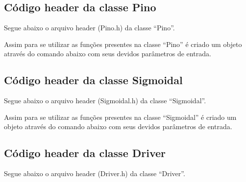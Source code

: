 \subsection{Código header da classe Pino}\label{subsec:respino}

Segue abaixo o arquivo header (Pino.h) da classe “Pino”.

{

Assim para se utilizar as funções presentes na classe “Pino” é criado um objeto 
através do comando abaixo com seus devidos parâmetros de entrada.

{

\subsection{Código header da classe Sigmoidal}\label{subsec:ressigmoidal}

Segue abaixo o arquivo header (Sigmoidal.h) da classe “Sigmoidal”.

{

Assim para se utilizar as funções presentes na classe “Sigmoidal” é criado um objeto 
através do comando abaixo com seus devidos parâmetros de entrada.

{

\subsection{Código header da classe Driver}\label{subsec:resdriver}
Segue abaixo o arquivo header (Driver.h) da classe “Driver”.

}}}}
